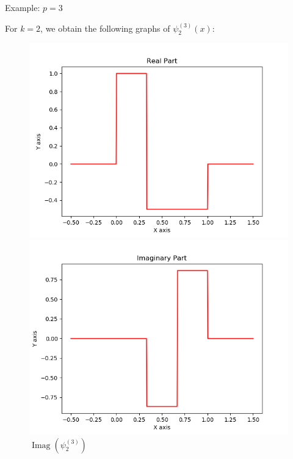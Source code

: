 \documentclass[hyperref, notheorems]{beamer}
\DeclareMathOperator{\Real}{\mathrm{Real}}
\DeclareMathOperator{\Imag}{\mathrm{Imag}}
\theoremstyle{definition}
\begin{document}
\begin{frame}{Example: $p = 3$}

For $k = 2$, we obtain the following graphs of $\psi_2^{(3)}(x)$:

\begin{figure}[!tbp]
  \centering
  \begin{minipage}[b]{0.45\textwidth}
    \includegraphics[width=\textwidth]{graphics/real_2.png}
    \caption{$\Real(\psi^{(3)}_2)$}
  \end{minipage}
  \hfill
  \begin{minipage}[b]{0.45\textwidth}
    \includegraphics[width=\textwidth]{graphics/imag_2.png}
    \caption{$\Imag(\psi^{(3)}_2)$}
  \end{minipage}
\end{figure}
    
\end{frame}
\end{document}
